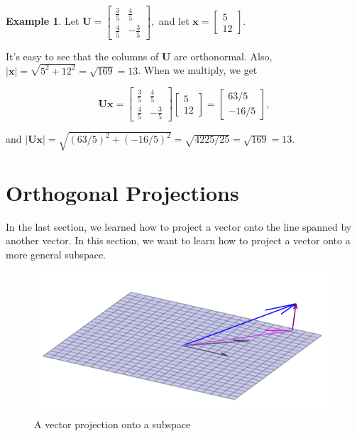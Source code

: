 \documentclass[
]{book}
\theoremstyle{definition}
\theoremstyle{definition}
\newtheorem{example}{Example}[chapter]
\theoremstyle{definition}
\theoremstyle{definition}
\theoremstyle{remark}
\begin{document}
\begin{examplebox}

\begin{example}
Let
\(\mathbf{U}=\begin{bmatrix}\frac{3}{5}&\frac{4}{5}\\\frac{4}{5}&-\frac{3}{5}\end{bmatrix},\)
and let \(\mathbf{x}=\begin{bmatrix}5\\12\end{bmatrix}\).

It's easy to see that the columns of \(\mathbf{U}\) are orthonormal. Also, \(|\mathbf{x}|=\sqrt{5^2+12^2}=\sqrt{169}=13\). When we multiply, we get

\[\mathbf{U}\mathbf{x}=\begin{bmatrix}\frac{3}{5}&\frac{4}{5}\\\frac{4}{5}&-\frac{3}{5}\end{bmatrix}\begin{bmatrix}5\\12\end{bmatrix}=\begin{bmatrix}63/5\\-16/5\end{bmatrix},\]

and \(|\mathbf{U}\mathbf{x}|=\sqrt{(63/5)^2+(-16/5)^2}=\sqrt{4225/25}=\sqrt{169}=13.\)
\end{example}

\end{examplebox}

\section{Orthogonal Projections}\label{OProj}

In the last section, we learned how to project a vector onto the line spanned by another vector. In this section, we want to learn how to project a vector onto a more general subspace.

\begin{figure}

{\centering \includegraphics[width=0.5\linewidth]{images/lsqvec} 

}

\caption{A vector projection onto a subspace}\label{fig:oproj}
\end{figure}
\end{document}
